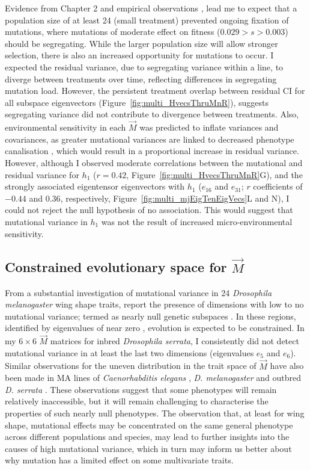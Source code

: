 Evidence from Chapter 2 and empirical observations \citep{Este04, Katj15}, lead me to expect that a population size of at least 24 (small treatment) prevented ongoing fixation of mutations, where mutations of moderate effect on fitness ($0.029 > s > 0.003$) should be segregating. While the larger population size will allow stronger selection, there is also an increased opportunity for mutations to occur. I expected the residual variance, due to segregating variance within a line, to diverge between treatments over time, reflecting differences in segregating mutation load. However, the persistent treatment overlap between residual CI for all subspace eigenvectors (Figure~\ref{fig:multi_HvecsThruMnR}), suggests segregating variance did not contribute to divergence between treatments. Also, environmental sensitivity in each $\vec{M}$ was predicted to inflate variances and covariances, as greater mutational variances are linked to decreased phenotype canalisation \citep{Stea95, Zhan05env, Baer08}, which would result in a proportional increase in residual variance. However, although I observed moderate correlations between the mutational and residual variance for $h_1$ ($r = 0.42$, Figure~\ref{fig:multi_HvecsThruMnR}G), and the strongly associated eigentensor eigenvectors with $h_1$ ($e_{16}$ and $e_{31}$; $r$ coefficients of $-0.44$ and $0.36$, respectively, Figure~\ref{fig:multi_mjEigTenEigVecs}L and N), I could not reject the null hypothesis of no association. This would suggest that mutational variance in $h_1$ was not the result of increased micro-environmental sensitivity.\par

\subsection{Constrained evolutionary space for $\vec{M}$}
From a substantial investigation of mutational variance in 24 \textit{Drosophila melanogaster} wing shape traits, \citet{Houl13} report the presence of dimensions with low to no mutational variance; termed as nearly null genetic subspaces \citep{Gomu09,Houl13,Hine14}. In these regions, identified by eigenvalues of near zero \citep{Meze05}, evolution is expected to be constrained. In my $6\times6$ $\vec{M}$ matrices for inbred \textit{Drosophila serrata}, I consistently did not detect mutational variance in at least the last two dimensions (eigenvalues $e_5$ and $e_6$). Similar observations for the uneven distribution in the trait space of $\vec{M}$ have also been made in MA lines of \textit{Caenorhabditis elegans} \citep{Keig00,Este05,Mall23}, \textit{D. melanogaster} and outbred \textit{D. serrata} \citep{Duga21}. These observations suggest that some phenotypes will remain relatively inaccessible, but it will remain challenging to characterise the properties of such nearly null phenotypes. The observation that, at least for wing shape, mutational effects may be concentrated on the same general phenotype across different populations and species, may lead to further insights into the causes of high mutational variance, which in turn may inform us better about why mutation has a limited effect on some multivariate traits.\par

